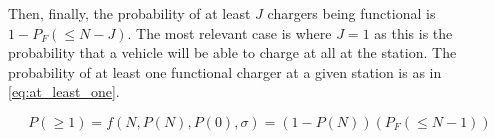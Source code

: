 \documentclass[11pt]{article}
\begin{document}
Then, finally, the probability of at least $J$ chargers being functional is $1 - P_F(\leq N-J)$. The most relevant case is where $J = 1$ as this is the probability that a vehicle will be able to charge at all at the station. The probability of at least one functional charger at a given station is as in \eqref{eq:at_least_one}.

\begin{equation}
	P(\geq 1) = f(N, P(N), P(0), \sigma) = (1 - P(N))(P_F(\leq N-1))\label{eq:at_least_one}
\end{equation}

%
%
%
%
\end{document}
